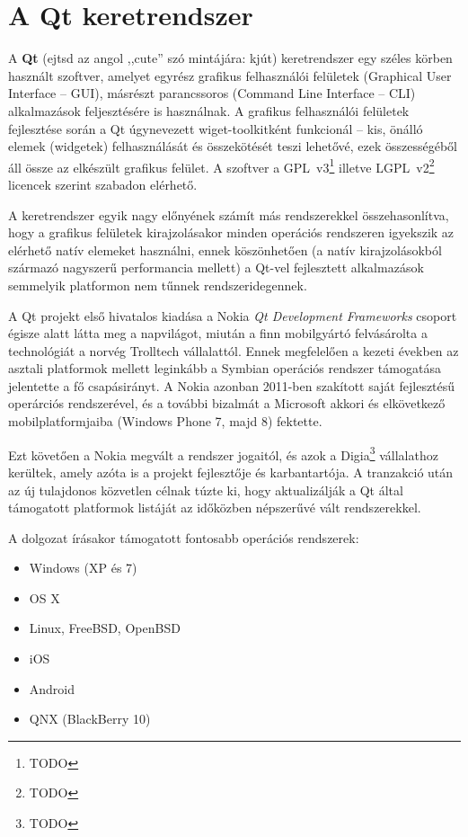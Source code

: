 \section{A Qt keretrendszer}\label{sect:qt}

A \textbf{Qt} (ejtsd az angol ,,cute'' szó mintájára: kjút) keretrendszer egy széles körben használt szoftver, amelyet egyrész grafikus felhasználói felületek (Graphical User Interface -- GUI), másrészt parancssoros (Command Line Interface -- CLI) alkalmazások feljesztésére is használnak. A grafikus felhasználói felületek fejlesztése során a Qt úgynevezett wiget-toolkitként funkcionál -- kis, önálló elemek (widgetek) felhasználását és összekötését teszi lehetővé, ezek összességéből áll össze az elkészült grafikus felület. A szoftver a  GPL~v3\footnote{TODO} illetve LGPL~v2\footnote{TODO} licencek szerint szabadon elérhető.

A keretrendszer egyik nagy előnyének számít más rendszerekkel összehasonlítva, hogy a grafikus felületek kirajzolásakor minden operációs rendszeren igyekszik az elérhető natív elemeket használni, ennek köszönhetően (a natív kirajzolásokból származó nagyszerű performancia mellett) a Qt-vel fejlesztett alkalmazások semmelyik platformon nem tűnnek rendszeridegennek.

\bigskip

A Qt projekt első hivatalos kiadása a Nokia \emph{Qt Development Frameworks} csoport égisze alatt látta meg a napvilágot, miután a finn mobilgyártó felvásárolta a technológiát a norvég Trolltech vállalattól. Ennek megfelelően a kezeti években az asztali platformok mellett leginkább a Symbian operációs rendszer támogatása jelentette a fő csapásirányt. A Nokia azonban 2011-ben szakított saját fejlesztésű operárciós rendszerével, és a további bizalmát a Microsoft akkori és elkövetkező mobilplatformjaiba (Windows Phone 7, majd 8) fektette.

Ezt követően a Nokia megvált a rendszer jogaitól, és azok a Digia\footnote{TODO} vállalathoz kerültek, amely azóta is a projekt fejlesztője és karbantartója. A tranzakció után az új tulajdonos közvetlen célnak túzte ki, hogy aktualizálják a Qt által támogatott platformok listáját az időközben népszerűvé vált rendszerekkel.

A dolgozat írásakor támogatott fontosabb operációs rendszerek:

\begin{itemize}
  \item Windows (XP és 7)
  \item OS X
  \item Linux, FreeBSD, OpenBSD
  \item iOS
  \item Android
  \item QNX (BlackBerry 10)
\end{itemize}

